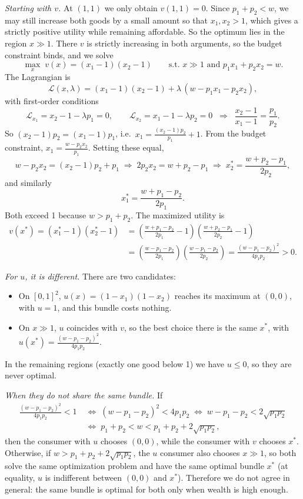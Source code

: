 \documentclass[12pt,letterpaper]{article}
\begin{document}
\textit{Starting with $v$.} At $(1,1)$ we only obtain $v(1,1)=0$. Since $p_1+p_2<w$, we may still increase both goods by a small amount so that $x_1,x_2>1$, which gives a strictly positive utility while remaining affordable. So the optimum lies in the region $x\gg 1$. There $v$ is strictly increasing in both arguments, so the budget constraint binds, and we solve
\[
\max_{x}\; v(x) = (x_1-1)(x_2-1) \qquad \text{s.t. } x\gg 1 \text{ and } p_1x_1+p_2x_2 = w .
\]
The Lagrangian is
\[
\mathcal{L}(x,\lambda) = (x_1-1)(x_2-1) + \lambda\,(w - p_1x_1 - p_2x_2),
\]
with first-order conditions
\[
\mathcal{L}_{x_1} = x_2-1-\lambda p_1 = 0, \qquad \mathcal{L}_{x_2} = x_1-1-\lambda p_2 = 0
\;\;\Longrightarrow\;\; \frac{x_2-1}{x_1-1} = \frac{p_1}{p_2}.
\]
So $(x_2-1)p_2 = (x_1-1)p_1$, i.e.\ $x_1 = \frac{(x_2-1)p_2}{p_1}+1$. From the budget constraint, $x_1 = \frac{w-p_2x_2}{p_1}$. Setting these equal,
\[
w - p_2x_2 = (x_2-1)p_2 + p_1 \;\Longrightarrow\; 2p_2x_2 = w+p_2-p_1 \;\Longrightarrow\; x_2^* = \frac{w+p_2-p_1}{2p_2},
\]
and similarly
\[
x_1^* = \frac{w+p_1-p_2}{2p_1}.
\]
Both exceed 1 because $w>p_1+p_2$. The maximized utility is
\begin{align*}
v(x^*) = (x_1^*-1)(x_2^*-1)
&= \left(\frac{w+p_1-p_2}{2p_1}-1\right)\left(\frac{w+p_2-p_1}{2p_2}-1\right)\\
&= \left(\frac{w-p_1-p_2}{2p_1}\right)\left(\frac{w-p_1-p_2}{2p_2}\right)
= \frac{(w-p_1-p_2)^2}{4p_1p_2} > 0 .
\end{align*}

\textit{For $u$, it is different.} There are two candidates:
\begin{itemize}
  \item On $[0,1]^2$, $u(x)=(1-x_1)(1-x_2)$ reaches its maximum at $(0,0)$, with $u=1$, and this bundle costs nothing.
  \item On $x\gg 1$, $u$ coincides with $v$, so the best choice there is the same $x^*$, with $u(x^*)=\frac{(w-p_1-p_2)^2}{4p_1p_2}$.
\end{itemize}
In the remaining regions (exactly one good below 1) we have $u\le 0$, so they are never optimal.

\textit{When they do not share the same bundle.} If
\begin{align*}
\frac{(w-p_1-p_2)^2}{4p_1p_2} < 1
&\;\Longleftrightarrow\; (w-p_1-p_2)^2 < 4p_1p_2
\;\Longleftrightarrow\; w-p_1-p_2 < 2\sqrt{p_1p_2}\\
&\;\Longleftrightarrow\; p_1+p_2 < w < p_1+p_2+2\sqrt{p_1p_2},
\end{align*}
then the consumer with $u$ chooses $(0,0)$, while the consumer with $v$ chooses $x^*$. Otherwise, if $w > p_1+p_2+2\sqrt{p_1p_2}$, the $u$ consumer also chooses $x\gg 1$, so both solve the same optimization problem and have the same optimal bundle $x^*$ (at equality, $u$ is indifferent between $(0,0)$ and $x^*$). Therefore we do not agree in general: the same bundle is optimal for both only when wealth is high enough.
\end{document}
